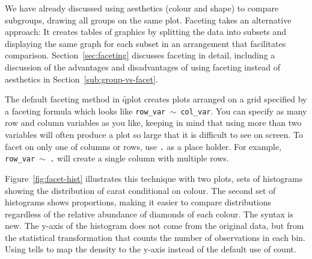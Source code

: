 We have already discussed using aesthetics (colour and shape) to compare subgroups, drawing all groups on the same plot. Faceting takes an alternative approach: It creates tables of graphics by splitting the data into subsets and displaying the same graph for each subset in an arrangement that facilitates comparison. Section~\ref{sec:faceting} discusses faceting in detail, including a discussion of the advantages and disadvantages of using faceting instead of aesthetics in Section~\ref{sub:group-vs-facet}.

The default faceting method in \f{qplot} creates plots arranged on a grid specified by a faceting formula which looks like {\tt row\_var $\sim$ col\_var}.  You can specify as many row and column variables as you like, keeping in mind that using more than two variables will often produce a plot so large that it is difficult to see on screen.  To facet on only one of columns or rows, use {\tt .} as a place holder.  For example, {\tt row\_var $\sim$ .} will create a single column with multiple rows.


Figure~\ref{fig:facet-hist} illustrates this technique with two plots, sets of histograms showing the distribution of carat conditional on colour.
The second set of histograms shows proportions, making it easier to compare distributions regardless of the relative abundance of diamonds of each colour. The  syntax is new. The y-axis of the histogram does not come from the original data, but from the statistical transformation that counts the number of observations in each bin.  Using  tells \ggplot to map the density to the y-axis instead of the default use of count.  

% 


